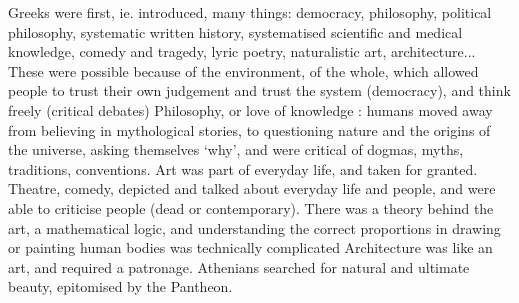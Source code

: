 \documentclass{article}
\begin{document}
\begin{outline}
	\1 Greeks were first, ie. introduced, many things: democracy, philosophy, political philosophy, systematic written history, systematised scientific and medical knowledge, comedy and tragedy, lyric poetry, naturalistic art, architecture... These were possible because of the environment, of the whole, which allowed people to trust their own judgement and trust the system (democracy), and think freely (critical debates)
	\1 Philosophy, or love of knowledge : humans moved away from believing in mythological stories, to questioning nature and the origins of the universe, asking themselves `why', and were critical of dogmas, myths, traditions, conventions.
	\1 Art was part of everyday life, and taken for granted. Theatre, comedy, depicted and talked about everyday life and people, and were able to criticise people (dead or contemporary). There was a theory behind the art, a mathematical logic, and understanding the correct proportions in drawing or painting human bodies was technically complicated
	\1 Architecture was like an art, and required a patronage. Athenians searched for natural and ultimate beauty, epitomised by the Pantheon. 

\end{outline}

\subsection{}

\begin{outline}
	\1
\end{outline}


\subsection{}

\begin{outline}
	\1
\end{outline}


\subsection{}

\begin{outline}
	\1
\end{outline}


\subsection{}

\begin{outline}
	\1
\end{outline}


\subsection{}

\begin{outline}
	\1
\end{outline}

\printbibliography
\end{document}
